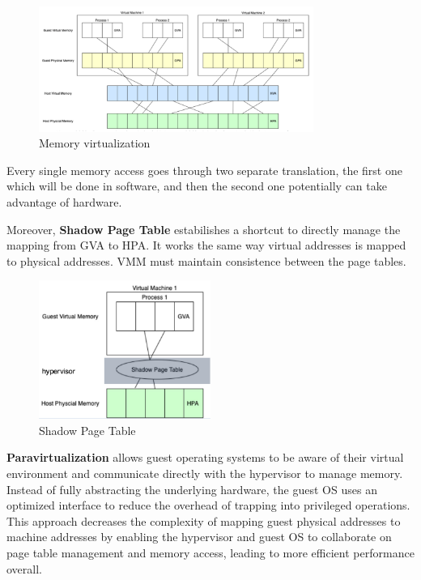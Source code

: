 \begin{figure}[H]
    \centering
    \includegraphics[width=0.8\textwidth]{assets/fig30.png}
    \caption{Memory virtualization}
\end{figure}

Every single memory access goes through two separate translation, the first one
which will be done in software, and then the second one potentially can take
advantage of hardware.

Moreover, \textbf{Shadow Page Table} estabilishes a shortcut to directly manage the mapping from GVA to HPA. It works the same way virtual addresses is mapped to physical addresses. VMM must maintain consistence between the page tables.

\begin{figure}[H]
    \centering
    \includegraphics[width=0.5\textwidth]{assets/fig31.png}
    \caption{Shadow Page Table}
\end{figure}

\textbf{Paravirtualization} allows guest operating systems to be aware of their virtual environment 
and communicate directly with the hypervisor to manage memory. 
Instead of fully abstracting the underlying hardware, the guest OS uses an optimized 
interface to reduce the overhead of trapping into privileged operations. 
This approach decreases the complexity of mapping guest physical addresses to machine 
addresses by enabling the hypervisor and guest OS to collaborate on page table management 
and memory access, leading to more efficient performance overall.

